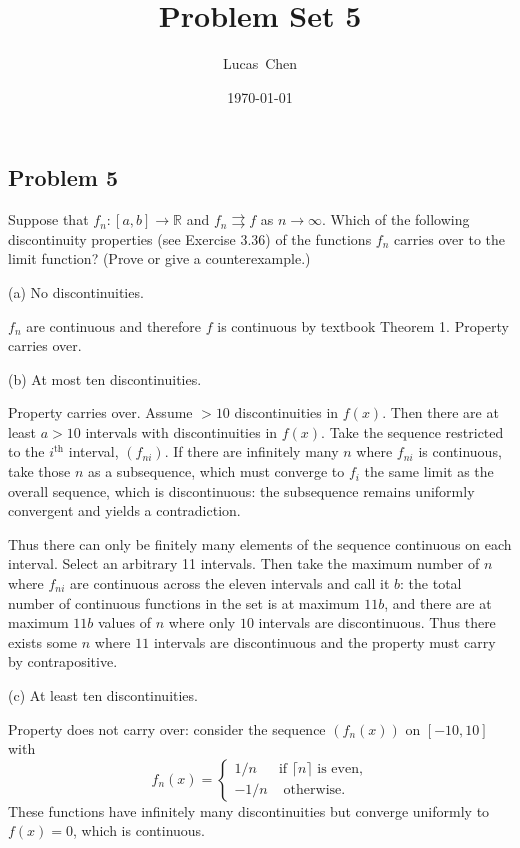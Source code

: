 \documentclass{amsart}
\title{Problem Set 5}
\author{Lucas\ Chen}
\date{\today}
\begin{document}
\maketitle



\subsection*{Problem 5} Suppose that \( f_n : [a, b] \to \mathbb{R} \) and \( f_n \rightrightarrows f \) as \( n \to \infty \). Which of the following discontinuity properties (see Exercise 3.36) of the functions \( f_n \) carries over to the limit function? (Prove or give a counterexample.)

(a) No discontinuities.

\medskip \noindent $f_n$ are continuous and therefore $f$ is continuous by textbook Theorem 1. Property carries over.

\bigskip

(b) At most ten discontinuities.

\medskip \noindent Property carries over. Assume $>10$ discontinuities in $f(x)$. Then there are at least $a>10$ intervals with
discontinuities in $f(x)$. Take the sequence restricted to the $i^{\text{th}}$ interval, $(f_{ni})$. If there are infinitely many $n$
where $f_{ni}$ is continuous, take those $n$ as a subsequence, which must converge to $f_i$ the same limit as the overall sequence,
which is discontinuous: the subsequence remains uniformly convergent and yields a contradiction.

\medskip \noindent Thus there can only be finitely many elements of the sequence continuous on each interval. Select an arbitrary
11 intervals. Then take the maximum number of $n$ where $f_{ni}$ are continuous across the eleven intervals and call it $b$: the total number of 
continuous functions in the set is at maximum $11b$, and there are at maximum $11b$ values of $n$ where
only $10$ intervals are discontinuous. Thus there exists some $n$ where $11$ intervals are discontinuous and the property must 
carry by contrapositive.

\bigskip

(c) At least ten discontinuities.

\medskip \noindent Property does not carry over: consider the sequence $(f_n(x))$ on $[-10, 10]$ with \[f_n(x)=\begin{cases}
    1/n & \text{if } \lceil n\rceil \text{ is even,}\\
    -1/n & \text{ otherwise.}
\end{cases}\]
These functions have infinitely many discontinuities but converge uniformly to $f(x)=0$, which is continuous.
\end{document}
